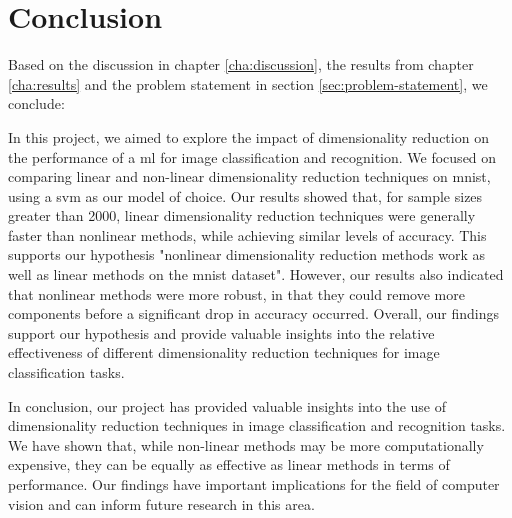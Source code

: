 \chapter{Conclusion}\label{cha:conclsvmusion}
Based on the discussion in chapter \ref{cha:discussion}, the results from chapter \ref{cha:results} and the problem statement in section \ref{sec:problem-statement}, we conclude:


In this project, we aimed to explore the impact of dimensionality reduction on the performance of a \gls{ml} for image classification and recognition. We focused on comparing linear and non-linear dimensionality reduction techniques on \gls{mnist}, using a \gls{svm} as our model of choice. Our results showed that, for sample sizes greater than 2000, linear dimensionality reduction techniques were generally faster than nonlinear methods, while achieving similar levels of accuracy. This supports our hypothesis "nonlinear dimensionality reduction methods work as well as linear methods on the \gls{mnist} dataset". However, our results also indicated that nonlinear methods were more robust, in that they could remove more components before a significant drop in accuracy occurred. Overall, our findings support our hypothesis and provide valuable insights into the relative effectiveness of different dimensionality reduction techniques for image classification tasks.

In conclusion, our project has provided valuable insights into the use of dimensionality reduction techniques in image classification and recognition tasks. We have shown that, while non-linear methods may be more computationally expensive, they can be equally as effective as linear methods in terms of performance. Our findings have important implications for the field of computer vision and can inform future research in this area.

